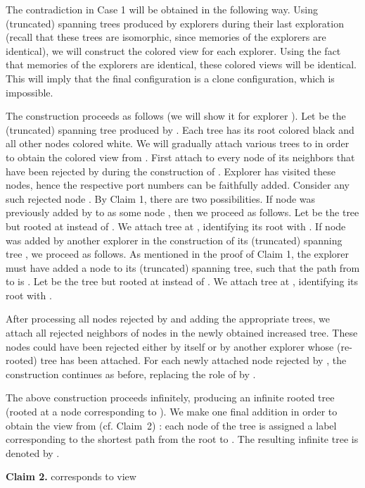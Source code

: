 \documentclass[11pt]{article}
\newcommand{\qed}{\hfill  \bigbreak}
\newenvironment{proof}{\noindent {\bf Proof.}}{\qed}
\begin{document}
\begin{proof}
The contradiction in Case 1 will be obtained in the following way. Using {(truncated) spanning} trees produced by explorers  during their last exploration 
(recall that these trees are isomorphic, since memories of the explorers are identical), we will construct the colored view for each explorer.
Using the fact that memories of the explorers are identical, these colored views will be identical. This will imply that the final configuration is a clone
configuration, which is impossible. 

The construction proceeds as follows (we will show it for explorer ). Let  be the {(truncated) spanning} tree produced by .
Each tree  has its root  colored black and all other nodes colored white. We will gradually
attach various trees to  in order to obtain the colored view from . 
First attach to every node of  its neighbors that have been rejected by  during the construction of . Explorer  has visited these
nodes, hence the respective port numbers can be faithfully added. Consider any such rejected node .  By Claim 1, there are two possibilities.
If node  was previously added by  to  as some node , then we proceed as follows. Let  be the tree  but rooted at  instead of .
We attach tree  at , identifying its root  with .
If node  was added  by another explorer  in the construction of its {(truncated) spanning} tree , we proceed as follows. 
As mentioned in the proof of Claim 1, the explorer  must have added a node  to its {(truncated) spanning} tree, such that the path from  to  is .
Let  be the tree  but rooted at  instead of . We attach tree  at , identifying its root  with .

After processing all nodes rejected by  and adding the appropriate trees, we attach all rejected neighbors of nodes in the newly obtained increased
tree. These nodes could have been rejected either by  itself or by another explorer  whose (re-rooted) tree  has been attached.
For each newly attached node rejected by , the construction continues as before, replacing the role of  by .

{The above construction proceeds infinitely, producing an infinite rooted tree (rooted at a node corresponding to ). We make one final addition in order to obtain the view  from  (cf. Claim~2) : each node  of the tree is assigned a label corresponding to the shortest path from the root to . The resulting infinite tree is denoted by }.

\vspace*{0.3cm}
\noindent
{{\bf Claim 2.}  corresponds to view }


\end{proof}
\end{document}
